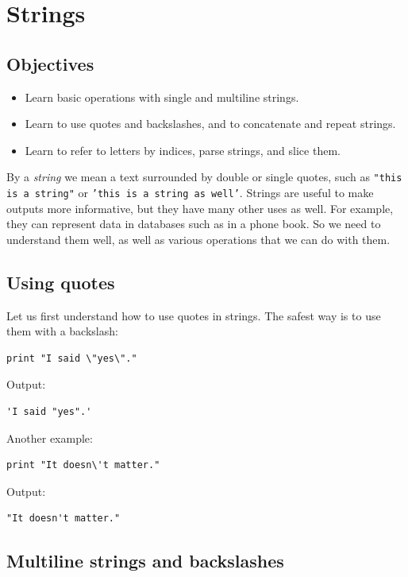 \section{Strings} \label{sec:strings}

\subsection{Objectives}

\begin{itemize}
\item Learn basic operations with single and multiline strings.
\item Learn to use quotes and backslashes, and to concatenate and repeat strings.
\item Learn to refer to letters by indices, parse strings, and slice them.
\end{itemize}
By a {\em string} we mean a text surrounded by double or single quotes, such as 
{\tt "this is a string"} or {\tt 'this is a string as well'}.
Strings are useful to make outputs more informative, but 
they have many other uses as well. For example, they can represent data 
in databases such as in a phone book. So we need to understand them well,
as well as various operations that we can do with them.

\subsection{Using quotes}

Let us first understand how to use quotes in strings. The safest way is to use 
them with a backslash:

\begin{verbatim}
print "I said \"yes\"."
\end{verbatim}
Output:

\begin{verbatim}
'I said "yes".'
\end{verbatim}
Another example:

\begin{verbatim}
print "It doesn\'t matter."
\end{verbatim}
Output:

\begin{verbatim}
"It doesn't matter."
\end{verbatim}

\subsection{Multiline strings and backslashes}

